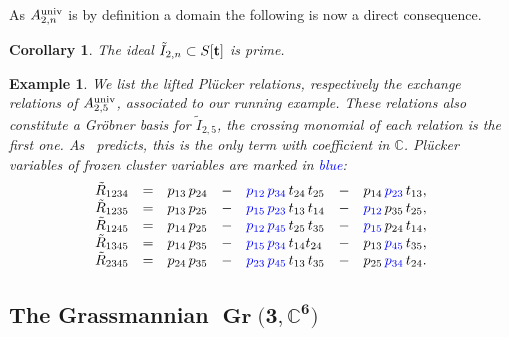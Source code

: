 \documentclass[pdftex]{sigma}%
\newtheorem{Corollary}[Theorem]{Corollary}
\newtheorem{Example}[Theorem]{Example}
\numberwithin{equation}{section}
\DeclareMathOperator{\Gr}{Gr}
\begin{document}
As $A_{2,n}^{\rm univ}$ is by definition a domain the following is now a direct consequence.

\begin{Corollary}
The ideal $\tilde I_{2,n}\subset S[{\bf t}]$ is prime.
\end{Corollary}



\begin{Example}
We list the lifted Pl\"ucker relations, respectively the exchange relations of $A_{2,5}^{\rm univ}$, associated to our running example. These relations also constitute a Gr\"obner basis for $\tilde I_{2,5}$, the crossing monomial of each relation is the first one. As~ predicts, this is the only term with coefficient in $\mathbb C$. Pl\"ucker variables of frozen cluster variables are marked in \textcolor{blue}{blue}:
\begin{displaymath}
\begin{matrix*}[l]
\tilde R_{1234} & = & p_{13}\,p_{24} & - & \textcolor{blue}{p_{12}\,p_{34}}\, t_{24}\,t_{25} & - & p_{14}\,\textcolor{blue}{p_{23}}\,t_{13}, \\
\tilde R_{1235} & = & p_{13}\,p_{25} & - & \textcolor{blue}{p_{15}\,p_{23}} \,t_{13}\, t_{14} & - & \textcolor{blue}{p_{12}}\,p_{35}\,t_{25}, \\
\tilde R_{1245} & = & p_{14}\,p_{25} & - & \textcolor{blue}{p_{12}\,p_{45}}\, t_{25}\, t_{35} & - & \textcolor{blue}{p_{15}}\,p_{24} \,t_{14}, \\
\tilde R_{1345} & = & p_{14}\,p_{35} & - & \textcolor{blue}{p_{15}\,p_{34}}\, t_{14}t_{24} & - & p_{13}\,\textcolor{blue}{p_{45}}\, t_{35}, \\
\tilde R_{2345} & = & p_{24}\,p_{35} & - & \textcolor{blue}{p_{23}\,p_{45}} \,t_{13}\,t_{35} & - & p_{25}\,\textcolor{blue}{p_{34}}\, t_{24}.
\end{matrix*}
\end{displaymath}
\end{Example}



\subsection[The Grassmannian of 3-planes in 6-space]
{The Grassmannian $\boldsymbol{\Gr\big(3,\mathbb C^6\big)}$}\label{sec:Gr(3,6)}
\end{document}
